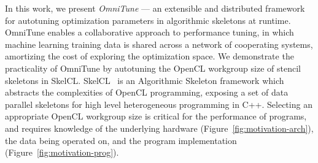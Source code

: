 \documentclass[times, 10pt,twocolumn]{article}
\begin{document}
In this work, we present \textit{OmniTune} --- an extensible and
distributed framework for autotuning optimization parameters in
algorithmic skeletons at runtime. OmniTune enables a collaborative
approach to performance tuning, in which machine learning training
data is shared across a network of cooperating systems, amortizing the
cost of exploring the optimization space. We demonstrate the
practicality of OmniTune by autotuning the OpenCL workgroup size of
stencil skeletons in SkelCL. SkelCL~\cite{Steuwer2011} is an
Algorithmic Skeleton framework which abstracts the complexities of
OpenCL programming, exposing a set of data parallel skeletons for high
level heterogeneous programming in C++. Selecting an appropriate
OpenCL workgroup size is critical for the performance of programs, and
requires knowledge of the underlying hardware
(Figure~\ref{fig:motivation-arch}), the data being operated on, and
the program implementation (Figure~\ref{fig:motivation-prog}).
\end{document}
